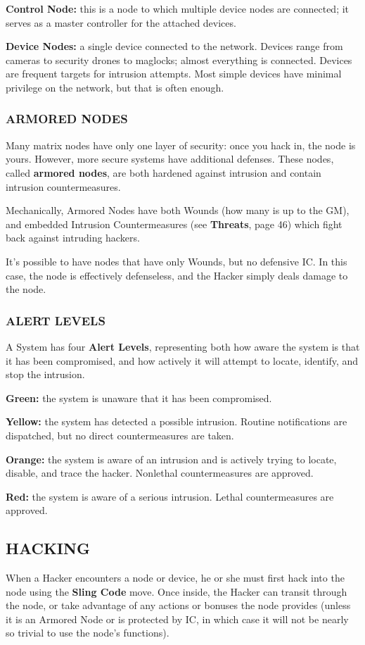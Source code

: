 \documentclass[oneside,10pt]{article}
\begin{document}
\begin{multicols}{2}
\begin{adjustwidth*}{.5cm}{.5cm}
\textbf{Control Node:} this is a node to which multiple device
nodes are connected; it serves as a master controller for
the attached devices.

\textbf{Device Nodes:} a single device connected to the network.
Devices range from cameras to security drones to maglocks; almost everything is connected. Devices are frequent targets for intrusion attempts. Most simple devices
have minimal privilege on the network, but that is often
enough.
\end{adjustwidth*}
\subsubsection{ARMORED NODES}
Many matrix nodes have only one layer of security: once 
you hack in, the node is yours. However, more secure systems have additional defenses. These nodes, called \textbf{armored 
nodes}, are both hardened against intrusion and contain intrusion countermeasures.

Mechanically, Armored Nodes have both Wounds (how many
is up to the GM), and embedded Intrusion Countermeasures
(see \textbf{Threats}, page 46) which fight back against intruding
hackers.

It’s possible to have nodes that have only Wounds, but no
defensive IC. In this case, the node is effectively defenseless,
and the Hacker simply deals damage to the node.

\subsubsection{ALERT LEVELS}
A System has four \textbf{Alert Levels}, representing both how aware
the system is that it has been compromised, and how actively
it will attempt to locate, identify, and stop the
intrusion.
\begin{adjustwidth*}{.5cm}{.5cm}
\textbf{Green:} the system is unaware that it has been compromised.

\textbf{Yellow:} the system has detected a possible intrusion. Routine notifications are dispatched, but no direct countermeasures are taken.

\textbf{Orange:} the system is aware of an intrusion and is actively
trying to locate, disable, and trace the hacker. Nonlethal
countermeasures are approved.

\textbf{Red:} the system is aware of a serious intrusion. Lethal
countermeasures are approved.
\end{adjustwidth*}
\subsection{HACKING}
When a Hacker encounters a node or device, he or she must
first hack into the node using the \textbf{Sling Code} move. Once
inside, the Hacker can transit through the node, or take advantage of any actions or bonuses the node provides (unless
it is an Armored Node or is protected by IC, in which case it
will not be nearly so trivial to use the node’s
functions).


\end{multicols}
\end{document}
